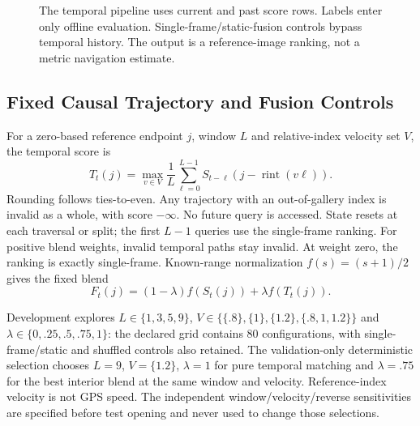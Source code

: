 \documentclass[conference]{IEEEtran}
\begin{document}
\begin{figure}[t]\centering
{}
\caption{The temporal pipeline uses current and past score rows. Labels enter only offline evaluation. Single-frame/static-fusion controls bypass temporal history. The output is a reference-image ranking, not a metric navigation estimate.}\label{fig:pipeline}
\end{figure}

\subsection{Fixed Causal Trajectory and Fusion Controls}
For a zero-based reference endpoint $j$, window $L$ and relative-index velocity set $V$, the temporal score is
\begin{equation}
T_t(j)=\max_{v\in V}\frac1L\sum_{\ell=0}^{L-1}S_{t-\ell}\!\left(j-\operatorname{rint}(v\ell)\right).
\label{eq:temporal}\end{equation}
Rounding follows ties-to-even. Any trajectory with an out-of-gallery index is invalid as a whole, with score $-\infty$. No future query is accessed. State resets at each traversal or split; the first $L-1$ queries use the single-frame ranking. For positive blend weights, invalid temporal paths stay invalid. At weight zero, the ranking is exactly single-frame. Known-range normalization $f(s)=(s+1)/2$ gives the fixed blend
\begin{equation}F_t(j)=(1-\lambda)f(S_t(j))+\lambda f(T_t(j)).\end{equation}

Development explores $L\in\{1,3,5,9\}$, $V\in\{\{.8\},\{1\},\{1.2\},\{.8,1,1.2\}\}$ and $\lambda\in\{0,.25,.5,.75,1\}$: the declared grid contains $80$ configurations, with single-frame/static and shuffled controls also retained. The validation-only deterministic selection chooses $L=9$, $V=\{1.2\}$, $\lambda=1$ for pure temporal matching and $\lambda=.75$ for the best interior blend at the same window and velocity. Reference-index velocity is not GPS speed. The independent window/velocity/reverse sensitivities are specified before test opening and never used to change those selections.
\end{document}
